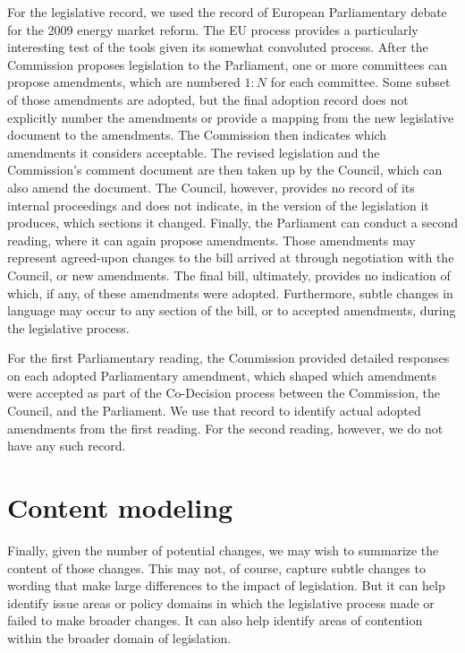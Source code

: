 \documentclass[11pt]{article}
\begin{document}
For the legislative record, we used the record of European
Parliamentary debate for the 2009 energy market reform. The EU process
provides a particularly interesting test of the tools given its
somewhat convoluted process. After the Commission proposes legislation
to the Parliament, one or more committees can propose amendments,
which are numbered $1:N$ for each committee. Some subset of those
amendments are adopted, but the final adoption record does not
explicitly number the amendments or provide a mapping from the new
legislative document to the amendments. The Commission then indicates
which amendments it considers acceptable. The revised legislation and
the Commission's comment document are then taken up by the Council,
which can also amend the document. The Council, however, provides no
record of its internal proceedings and does not indicate, in the
version of the legislation it produces, which sections it
changed. Finally, the Parliament can conduct a second reading, where
it can again propose amendments. Those amendments may represent
agreed-upon changes to the bill arrived at through negotiation with
the Council, or new amendments. The final bill, ultimately, provides
no indication of which, if any, of these amendments were
adopted. Furthermore, subtle changes in language may occur to any
section of the bill, or to accepted amendments, during the legislative
process. 

For the first
Parliamentary reading, the Commission provided detailed responses on
each adopted Parliamentary amendment, which shaped which amendments
were accepted as part of the Co-Decision process between the
Commission, the Council, and the Parliament. We use that record to
identify actual adopted amendments from the first reading. For the
second reading, however, we do not have any such record. 


\section{Content modeling}
\label{sec:content-modeling}

Finally, given the number of potential changes, we may wish to
summarize the content of those changes. This may not, of course,
capture subtle changes to wording that make large differences to the
impact of legislation. But it can help identify issue areas or policy
domains in which the legislative process made or failed to make
broader changes. It can also help identify areas of contention within
the broader domain of legislation. 
\end{document}
